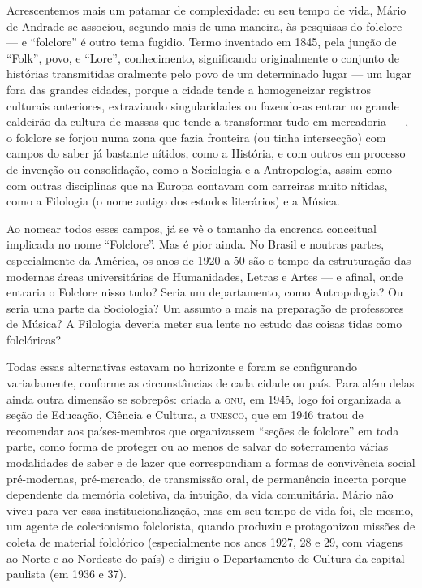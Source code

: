 Acrescentemos mais um patamar de complexidade: eu seu tempo de vida,
Mário de Andrade se associou, segundo mais de uma maneira, às pesquisas
do folclore --- e ``folclore'' é outro tema fugidio. Termo inventado em
1845, pela junção de ``Folk'', povo, e ``Lore'', conhecimento,
significando originalmente o conjunto de histórias transmitidas
oralmente pelo povo de um determinado lugar --- um lugar fora das grandes
cidades, porque a cidade tende a homogeneizar registros culturais
anteriores, extraviando singularidades ou fazendo-as entrar no grande
caldeirão da cultura de massas que tende a transformar tudo em
mercadoria --- , o folclore se forjou numa zona que fazia fronteira (ou
tinha intersecção) com campos do saber já bastante nítidos, como a
História, e com outros em processo de invenção ou consolidação, como a
Sociologia e a Antropologia, assim como com outras disciplinas que na
Europa contavam com carreiras muito nítidas, como a Filologia (o nome
antigo dos estudos literários) e a Música.

Ao nomear todos esses campos, já se vê o tamanho da encrenca conceitual
implicada no nome ``Folclore''. Mas é pior ainda. No Brasil e noutras
partes, especialmente da América, os anos de 1920 a 50 são o tempo da
estruturação das modernas áreas universitárias de Humanidades, Letras e
Artes --- e afinal, onde entraria o Folclore nisso tudo? Seria um
departamento, como Antropologia? Ou seria uma parte da Sociologia? Um
assunto a mais na preparação de professores de Música? A Filologia
deveria meter sua lente no estudo das coisas tidas como folclóricas?

Todas essas alternativas estavam no horizonte e foram se configurando
variadamente, conforme as circunstâncias de cada cidade ou país. Para
além delas ainda outra dimensão se sobrepôs: criada a \textsc{onu}, em 1945, logo
foi organizada a seção de Educação, Ciência e Cultura, a \textsc{unesco}, que em
1946 tratou de recomendar aos países-membros que organizassem ``seções
de folclore'' em toda parte, como forma de proteger ou ao menos de
salvar do soterramento várias modalidades de saber e de lazer que
correspondiam a formas de convivência social pré-modernas, pré-mercado,
de transmissão oral, de permanência incerta porque dependente da memória
coletiva, da intuição, da vida comunitária. Mário não viveu para ver
essa institucionalização, mas em seu tempo de vida foi, ele mesmo, um
agente de colecionismo folclorista, quando produziu e protagonizou
missões de coleta de material folclórico (especialmente nos anos 1927,
28 e 29, com viagens ao Norte e ao Nordeste do país) e dirigiu o
Departamento de Cultura da capital paulista (em 1936 e 37).

